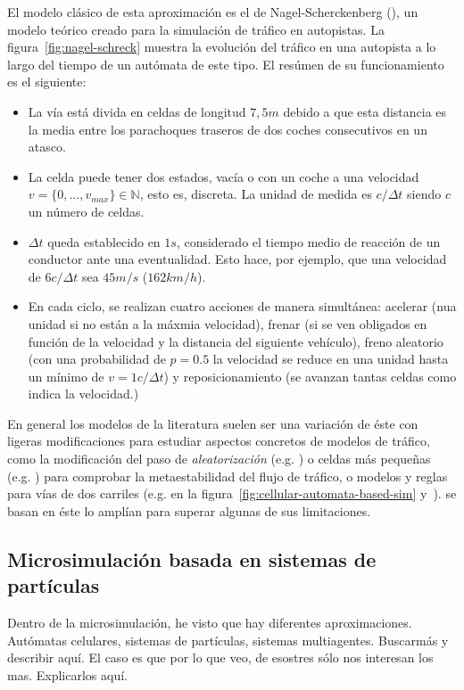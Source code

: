 El modelo clásico de esta aproximación es el de Nagel-Scherckenberg (\cite{Nagel1992}), un modelo teórico creado para la simulación de tráfico en autopistas. La figura~\ref{fig:nagel-schreck} muestra la evolución del tráfico en una autopista a lo largo del tiempo de un autómata de este tipo. El resúmen de su funcionamiento es el siguiente:

\begin{itemize}
	\item La vía está divida en celdas de longitud $7,5m$ debido a que esta distancia es la media entre los parachoques traseros de dos coches consecutivos en un atasco.
	\item La celda puede tener dos estados, vacía o con un coche a una velocidad $v = \{0, \ldots, v_{max}\} \in \mathbb{N}$, esto es, discreta. La unidad de medida es $c/\Delta t$ siendo $c$ un número de celdas.
	\item $\Delta t$ queda establecido en $1s$, considerado el tiempo medio de reacción de un conductor ante una eventualidad. Esto hace, por ejemplo, que una velocidad de $6 c/\Delta t$ sea $45 m/s$ ($162 km/h$).
	\item En cada ciclo, se realizan cuatro acciones de manera simultánea: acelerar (nua unidad si no están a la máxmia velocidad), frenar (si se ven obligados en función de la velocidad y la distancia del siguiente vehículo), freno aleatorio (con una probabilidad de $p = 0.5$ la velocidad se reduce en una unidad hasta un mínimo de $v = 1 c/\Delta t$) y reposicionamiento (se avanzan tantas celdas como indica la velocidad.)
\end{itemize}

En general los modelos de la literatura suelen ser una variación de éste con ligeras modificaciones para estudiar aspectos concretos de modelos de tráfico, como la modificación del paso de \textit{aleatorización} (e.g. \cite{Barlovic1998}) o celdas más pequeñas (e.g. \cite{Krauss1997}) para comprobar la metaestabilidad del flujo de tráfico, o modelos y reglas para vías de dos carriles (e.g. \cite{Brilon1999} en la figura~\ref{fig:cellular-automata-based-sim} y~\cite{Nagel1998}).  se basan en éste lo amplían para superar algunas de sus limitaciones.

\subsection{Microsimulación basada en sistemas de partículas}

Dentro de la microsimulación, he visto que hay diferentes aproximaciones. Autómatas celulares, sistemas de partículas, sistemas multiagentes. Buscarmás y describir aquí. El caso es que por lo que veo, de esostres sólo nos interesan los mas. Explicarlos aquí.

